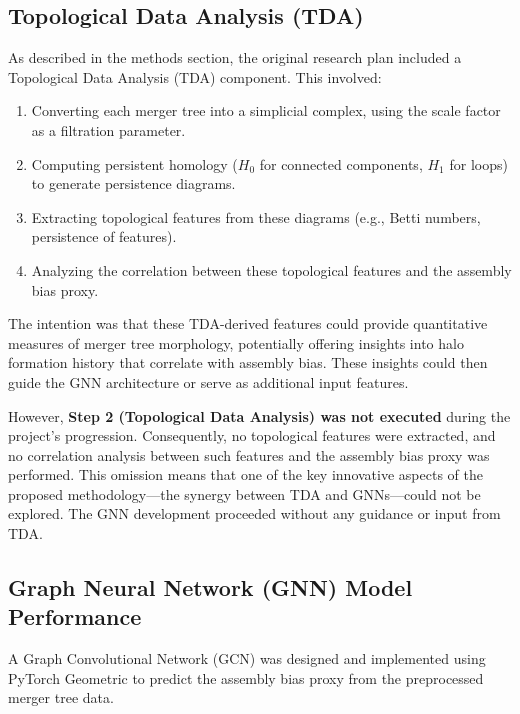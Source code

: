 \documentclass[twocolumn]{aastex631}
\begin{document}
\subsection{Topological Data Analysis (TDA)}

As described in the methods section, the original research plan included a Topological Data Analysis (TDA) component. This involved:
\begin{enumerate}
    \item Converting each merger tree into a simplicial complex, using the scale factor as a filtration parameter.
    \item Computing persistent homology ($H_0$ for connected components, $H_1$ for loops) to generate persistence diagrams.
    \item Extracting topological features from these diagrams (e.g., Betti numbers, persistence of features).
    \item Analyzing the correlation between these topological features and the assembly bias proxy.
\end{enumerate}

The intention was that these TDA-derived features could provide quantitative measures of merger tree morphology, potentially offering insights into halo formation history that correlate with assembly bias. These insights could then guide the GNN architecture or serve as additional input features.

However, \textbf{Step 2 (Topological Data Analysis) was not executed} during the project's progression. Consequently, no topological features were extracted, and no correlation analysis between such features and the assembly bias proxy was performed. This omission means that one of the key innovative aspects of the proposed methodology—the synergy between TDA and GNNs—could not be explored. The GNN development proceeded without any guidance or input from TDA.

\subsection{Graph Neural Network (GNN) Model Performance}

A Graph Convolutional Network (GCN) was designed and implemented using PyTorch Geometric to predict the assembly bias proxy from the preprocessed merger tree data.
\end{document}
